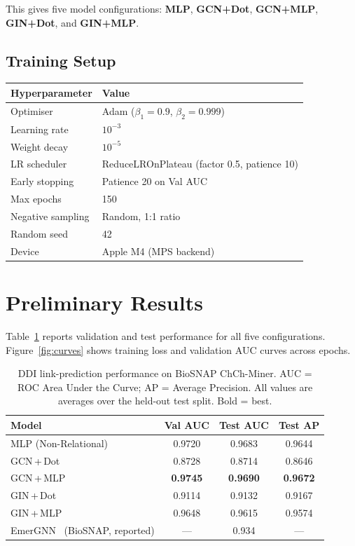 \documentclass[11pt,a4paper]{article}
\begin{document}
This gives five model configurations: \textbf{MLP}, \textbf{GCN+Dot},
\textbf{GCN+MLP}, \textbf{GIN+Dot}, and \textbf{GIN+MLP}.

\subsection{Training Setup}
\begin{center}
\begin{tabular}{ll}
\toprule
Hyperparameter & Value \\
\midrule
Optimiser           & Adam ($\beta_1\!=\!0.9$, $\beta_2\!=\!0.999$) \\
Learning rate       & $10^{-3}$ \\
Weight decay        & $10^{-5}$ \\
LR scheduler        & ReduceLROnPlateau (factor 0.5, patience 10) \\
Early stopping      & Patience 20 on Val AUC \\
Max epochs          & 150 \\
Negative sampling   & Random, 1:1 ratio \\
Random seed         & 42 \\
Device              & Apple M4 (MPS backend) \\
\bottomrule
\end{tabular}
\end{center}

\section{Preliminary Results}

Table~\ref{tab:results} reports validation and test performance for all
five configurations.
Figure~\ref{fig:curves} shows training loss and validation AUC curves
across epochs.

\begin{table}[h]
\centering
\caption{DDI link-prediction performance on BioSNAP ChCh-Miner.
AUC = ROC Area Under the Curve; AP = Average Precision.
All values are averages over the held-out test split.
Bold = best.}
\label{tab:results}
\begin{tabular}{lccc}
\toprule
Model & Val AUC & Test AUC & Test AP \\
\midrule
MLP (Non-Relational)         & 0.9720          & 0.9683          & 0.9644 \\
GCN\,+\,Dot                  & 0.8728          & 0.8714          & 0.8646 \\
GCN\,+\,MLP                  & \textbf{0.9745} & \textbf{0.9690} & \textbf{0.9672} \\
GIN\,+\,Dot                  & 0.9114          & 0.9132          & 0.9167 \\
GIN\,+\,MLP                  & 0.9648          & 0.9615          & 0.9574 \\
\midrule
EmerGNN~\cite{zhang2023} (BioSNAP, reported) & --- & 0.934 & --- \\
\bottomrule
\end{tabular}
\end{table}
\end{document}
